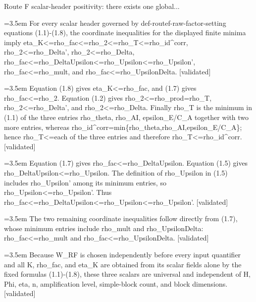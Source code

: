 \documentclass{article}
\newcommand{\step}[1]{\par\noindent\hangindent=3.5em\hangafter=1%
  \makebox[3.5em][l]{\textbf{#1.}}}
\newcommand{\steptag}[1]{\hfill{\small\textsf{[#1]}}}
\begin{document}
\begin{proofbox}{Route F scalar-header positivity: there exists one global...}
\step{1.3} For every scalar header governed by def-routef-raw-factor-setting equations (1.1)-(1.8), the coordinate inequalities for the displayed finite minima imply eta\_K<=rho\_fac<=rho\_2<=rho\_T<=rho\_id\textasciicircum{}corr, rho\_2<=rho\_Delta', rho\_2<=rho\_Delta, rho\_fac<=rho\_DeltaUpsilon<=rho\_Upsilon<=rho\_Upsilon', rho\_fac<=rho\_mult, and rho\_fac<=rho\_UpsilonDelta. \steptag{validated} \\[6pt]
\step{1.3.1} Equation (1.8) gives eta\_K<=rho\_fac, and (1.7) gives rho\_fac<=rho\_2. Equation (1.2) gives rho\_2<=rho\_prod=rho\_T, rho\_2<=rho\_Delta', and rho\_2<=rho\_Delta. Finally rho\_T is the minimum in (1.1) of the three entries rho\_theta, rho\_AI, epsilon\_E/C\_A together with two more entries, whereas rho\_id\textasciicircum{}corr=min\{rho\_theta,rho\_AI,epsilon\_E/C\_A\}; hence rho\_T<=each of the three entries and therefore rho\_T<=rho\_id\textasciicircum{}corr. \steptag{validated} \\[4pt]
\step{1.3.2} Equation (1.7) gives rho\_fac<=rho\_DeltaUpsilon. Equation (1.5) gives rho\_DeltaUpsilon<=rho\_Upsilon. The definition of rho\_Upsilon in (1.5) includes rho\_Upsilon' among its minimum entries, so rho\_Upsilon<=rho\_Upsilon'. Thus rho\_fac<=rho\_DeltaUpsilon<=rho\_Upsilon<=rho\_Upsilon'. \steptag{validated} \\[4pt]
\step{1.3.3} The two remaining coordinate inequalities follow directly from (1.7), whose minimum entries include rho\_mult and rho\_UpsilonDelta: rho\_fac<=rho\_mult and rho\_fac<=rho\_UpsilonDelta. \steptag{validated} \\[4pt]
\step{1.4} Because W\_RF is chosen independently before every input quantifier and all K, rho\_fac, and eta\_K are obtained from its scalar fields alone by the fixed formulas (1.1)-(1.8), these three scalars are universal and independent of H, Phi, eta, n, amplification level, simple-block count, and block dimensions. \steptag{validated} \\[4pt]
\end{proofbox}
\end{document}
